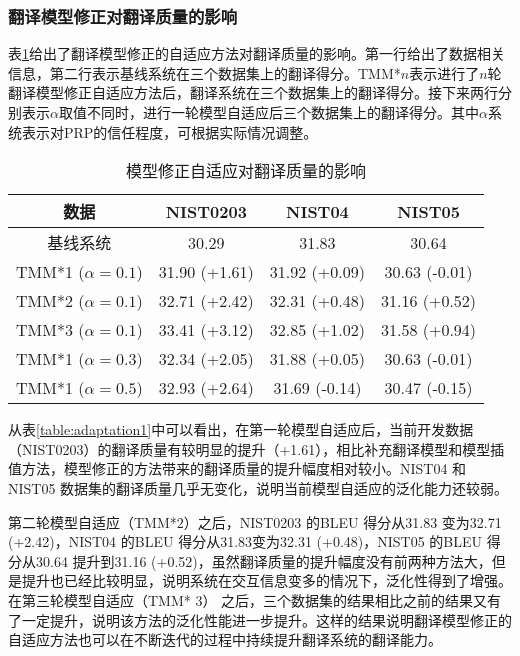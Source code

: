 \documentclass[master, winfont]{njuthesis}
\begin{document}
\subsubsection{翻译模型修正对翻译质量的影响}
表\ref{table:adaptation3}给出了翻译模型修正的自适应方法对翻译质量的影响。第一行给出了数据相关信息，第二行表示基线系统在三个数据集上的翻译得分。TMM*$n$表示进行了$n$轮翻译模型修正自适应方法后，翻译系统在三个数据集上的翻译得分。接下来两行分别表示$\alpha$取值不同时，进行一轮模型自适应后三个数据集上的翻译得分。其中$\alpha$系统表示对PRP的信任程度，可根据实际情况调整。

\begin{table}[!htb]
\begin{center}
\begin{tabular}{c|c|c|c}
\hline
数据& NIST0203 & NIST04 & NIST05\\
\hline
基线系统 & 30.29 & 31.83 & 30.64 \\
\hline
TMM*1 ($\alpha = 0.1$) & 31.90 (+1.61) & 31.92 (+0.09)& 30.63 (-0.01)\\
\hline
TMM*2 ($\alpha = 0.1$) & 32.71 (+2.42) & 32.31 (+0.48)& 31.16 (+0.52)\\
\hline
TMM*3 ($\alpha = 0.1$) & 33.41 (+3.12) & 32.85 (+1.02)& 31.58 (+0.94)\\
\hline
\hline
TMM*1 ($\alpha = 0.3$) & 32.34 (+2.05)& 31.88 (+0.05) & 30.63 (-0.01)\\
\hline
TMM*1 ($\alpha = 0.5$) & 32.93 (+2.64)& 31.69 (-0.14) & 30.47 (-0.15)\\
\hline
\end{tabular}
\end{center}
\caption{\label{table:adaptation3} 模型修正自适应对翻译质量的影响}
\end{table}

从表\ref{table:adaptation1}中可以看出，在第一轮模型自适应后，当前开发数据（NIST0203）的翻译质量有较明显的提升（+1.61），相比补充翻译模型和模型插值方法，模型修正的方法带来的翻译质量的提升幅度相对较小。NIST04 和NIST05 数据集的翻译质量几乎无变化，说明当前模型自适应的泛化能力还较弱。

第二轮模型自适应（TMM*$2$）之后，NIST0203 的BLEU 得分从31.83 变为32.71 (+2.42)，NIST04 的BLEU 得分从31.83变为32.31 (+0.48)，NIST05 的BLEU 得分从30.64 提升到31.16 (+0.52)，虽然翻译质量的提升幅度没有前两种方法大，但是提升也已经比较明显，说明系统在交互信息变多的情况下，泛化性得到了增强。在第三轮模型自适应（TMM* $3$） 之后，三个数据集的结果相比之前的结果又有了一定提升，说明该方法的泛化性能进一步提升。这样的结果说明翻译模型修正的自适应方法也可以在不断迭代的过程中持续提升翻译系统的翻译能力。
\end{document}
